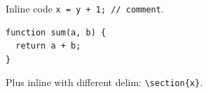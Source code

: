 \documentclass{article}
\begin{document}
Inline code \verb|x = y + 1; // comment|.
\begin{verbatim}
function sum(a, b) {
  return a + b;
}
\end{verbatim}
Plus inline with different delim: \verb+\section{x}+.
\end{document}
